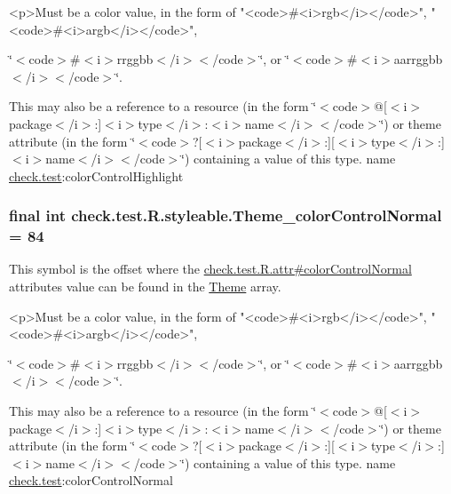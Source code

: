 \begin{DoxyVerb}      <p>Must be a color value, in the form of "<code>#<i>rgb</i></code>", "<code>#<i>argb</i></code>",
\end{DoxyVerb}
 \char`\"{}$<$code$>$\#$<$i$>$rrggbb$<$/i$>$$<$/code$>$\char`\"{}, or \char`\"{}$<$code$>$\#$<$i$>$aarrggbb$<$/i$>$$<$/code$>$\char`\"{}. 

This may also be a reference to a resource (in the form \char`\"{}$<$code$>$@\mbox{[}$<$i$>$package$<$/i$>$\+:\mbox{]}$<$i$>$type$<$/i$>$\+:$<$i$>$name$<$/i$>$$<$/code$>$\char`\"{}) or theme attribute (in the form \char`\"{}$<$code$>$?\mbox{[}$<$i$>$package$<$/i$>$\+:\mbox{]}\mbox{[}$<$i$>$type$<$/i$>$\+:\mbox{]}$<$i$>$name$<$/i$>$$<$/code$>$\char`\"{}) containing a value of this type.  name \hyperlink{namespacecheck_1_1test}{check.\+test}\+:color\+Control\+Highlight \hypertarget{classcheck_1_1test_1_1_r_1_1styleable_a3fd140e79d5c291ac4ded3f747b333fd}{}
\subsubsection[{Theme\+\_\+color\+Control\+Normal}]{\setlength{\rightskip}{0pt plus 5cm}final int check.\+test.\+R.\+styleable.\+Theme\+\_\+color\+Control\+Normal = 84\hspace{0.3cm}{\ttfamily [static]}}\label{classcheck_1_1test_1_1_r_1_1styleable_a3fd140e79d5c291ac4ded3f747b333fd}
This symbol is the offset where the \hyperlink{classcheck_1_1test_1_1_r_1_1attr_aaf758f83271cca56f8236b89bc085b85}{check.\+test.\+R.\+attr\#color\+Control\+Normal} attribute\textquotesingle{}s value can be found in the \hyperlink{classcheck_1_1test_1_1_r_1_1styleable_acca726d02016a0cf607782ec3a436a81}{Theme} array.

\begin{DoxyVerb}      <p>Must be a color value, in the form of "<code>#<i>rgb</i></code>", "<code>#<i>argb</i></code>",
\end{DoxyVerb}
 \char`\"{}$<$code$>$\#$<$i$>$rrggbb$<$/i$>$$<$/code$>$\char`\"{}, or \char`\"{}$<$code$>$\#$<$i$>$aarrggbb$<$/i$>$$<$/code$>$\char`\"{}. 

This may also be a reference to a resource (in the form \char`\"{}$<$code$>$@\mbox{[}$<$i$>$package$<$/i$>$\+:\mbox{]}$<$i$>$type$<$/i$>$\+:$<$i$>$name$<$/i$>$$<$/code$>$\char`\"{}) or theme attribute (in the form \char`\"{}$<$code$>$?\mbox{[}$<$i$>$package$<$/i$>$\+:\mbox{]}\mbox{[}$<$i$>$type$<$/i$>$\+:\mbox{]}$<$i$>$name$<$/i$>$$<$/code$>$\char`\"{}) containing a value of this type.  name \hyperlink{namespacecheck_1_1test}{check.\+test}\+:color\+Control\+Normal \hypertarget{classcheck_1_1test_1_1_r_1_1styleable_add0a3bacfd686c812b1d7045c47b17d5}{}
